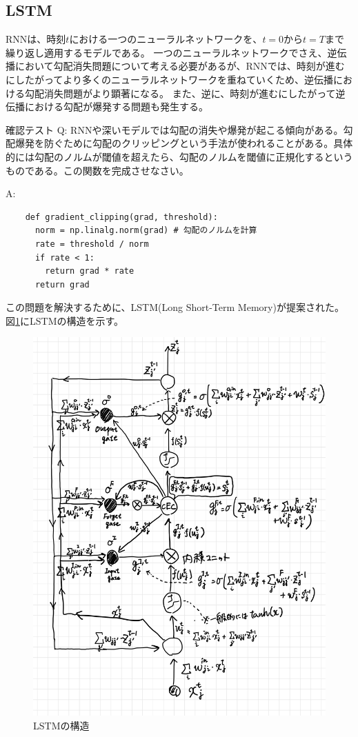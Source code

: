 \documentclass{ltjsarticle}
\begin{document}
\subsection{LSTM}
RNNは、時刻$t$における一つのニューラルネットワークを、$t=0$から$t=T$まで繰り返し適用するモデルである。
一つのニューラルネットワークでさえ、逆伝播において勾配消失問題について考える必要があるが、RNNでは、時刻が進むにしたがってより多くのニューラルネットワークを重ねていくため、逆伝播における勾配消失問題がより顕著になる。
また、逆に、時刻が進むにしたがって逆伝播における勾配が爆発する問題も発生する。
\begin{itembox}[l]{確認テスト}
  Q: RNNや深いモデルでは勾配の消失や爆発が起こる傾向がある。勾配爆発を防ぐために勾配のクリッピングという手法が使われることがある。具体的には勾配のノルムが閾値を超えたら、勾配のノルムを閾値に正規化するというものである。この関数を完成させなさい。

  A: 
  \begin{verbatim}
    def gradient_clipping(grad, threshold):
      norm = np.linalg.norm(grad) # 勾配のノルムを計算
      rate = threshold / norm
      if rate < 1:
        return grad * rate 
      return grad
  \end{verbatim}  

\end{itembox}

この問題を解決するために、LSTM(Long Short-Term Memory)が提案された。
図\ref{fig:LSTM}にLSTMの構造を示す。
\begin{figure}[htbp]
  \centering
  \includegraphics[width=13cm]{./capture/LSTM-33.jpg}
  \caption{LSTMの構造}
  \label{fig:LSTM}
\end{figure}
\end{document}
